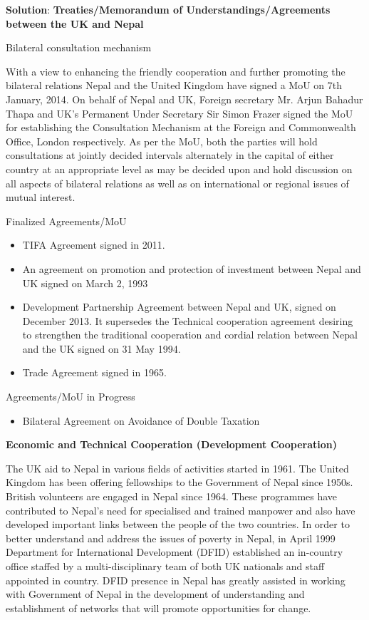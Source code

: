 \documentclass[
  openany]{book}
\newenvironment{solution}{ {\bfseries Solution}:}{}
\begin{document}
\begin{solution}
\textbf{Treaties/Memorandum of Understandings/Agreements between the UK and Nepal}

Bilateral consultation mechanism

With a view to enhancing the friendly cooperation and further promoting the bilateral relations Nepal and the United Kingdom have signed a MoU on 7th January, 2014. On behalf of Nepal and UK, Foreign secretary Mr. Arjun Bahadur Thapa and UK's Permanent Under Secretary Sir Simon Frazer signed the MoU for establishing the Consultation Mechanism at the Foreign and Commonwealth Office, London respectively. As per the MoU, both the parties will hold consultations at jointly decided intervals alternately in the capital of either country at an appropriate level as may be decided upon and hold discussion on all aspects of bilateral relations as well as on international or regional issues of mutual interest.

Finalized Agreements/MoU

\begin{itemize}
\item TIFA Agreement signed in 2011.
\item An agreement on promotion and protection of investment between Nepal and UK signed on March 2, 1993
\item Development Partnership Agreement between Nepal and UK, signed on December 2013. It supersedes the Technical cooperation agreement desiring to strengthen the traditional cooperation and cordial relation between Nepal and the UK signed on 31 May 1994.
\item Trade Agreement signed in 1965.
\end{itemize}

Agreements/MoU in Progress

\begin{itemize}
\item Bilateral Agreement on Avoidance of Double Taxation
\end{itemize}

\textbf{Economic and Technical Cooperation (Development Cooperation)}

The UK aid to Nepal in various fields of activities started in 1961. The United Kingdom has been offering fellowships to the Government of Nepal since 1950s. British volunteers are engaged in Nepal since 1964. These programmes have contributed to Nepal's need for specialised and trained manpower and also have developed important links between the people of the two countries. In order to better understand and address the issues of poverty in Nepal, in April 1999 Department for International Development (DFID) established an in-country office staffed by a multi-disciplinary team of both UK nationals and staff appointed in country. DFID presence in Nepal has greatly assisted in working with Government of Nepal in the development of understanding and establishment of networks that will promote opportunities for change.


\end{solution}
\end{document}
